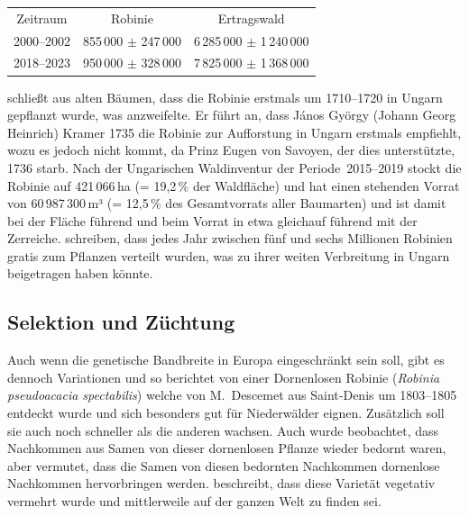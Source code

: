 \documentclass[twocolumn]{scrartcl}
\begin{document}
\begin{table}[htbp]
  \centering
\begin{tabular}{ccc}
Zeitraum   & Robinie  & Ertragswald \\
2000--2002  & 855\,000 $\pm$ 247\,000 & 6\,285\,000 $\pm$ 1\,240\,000 \\
2018--2023  & 950\,000 $\pm$ 328\,000 & 7\,825\,000 $\pm$ 1\,368\,000 
  \end{tabular}
  \label{tab:waldinventur}
\end{table}

\citet[S.~3]{vadas1911robinie} schließt aus alten Bäumen, dass
die Robinie erstmals um 1710--1720 in Ungarn gepflanzt wurde, was
\citet[S.~179]{ernyey1926robinie} anzweifelte. Er führt an, dass
János György (Johann Georg Heinrich) Kramer 1735 die Robinie zur
Aufforstung in Ungarn erstmals empfiehlt, wozu es jedoch nicht kommt, da
Prinz Eugen von Savoyen, der dies unterstützte, 1736 starb. Nach der
Ungarischen Waldinventur \citep{waldinventur20152019ungarn} der
Periode~2015--2019 stockt die Robinie auf
421\,066\,ha (= 19,2\,\% der Waldfläche) und hat einen stehenden Vorrat von
60\,987\,300\,m³ (= 12,5\,\% des Gesamtvorrats aller Baumarten) und ist
damit bei der Fläche führend und beim Vorrat in etwa gleichauf führend
mit der Zerreiche. \cite{bund1899robinie,gaskil1906robinie} schreiben,
dass jedes Jahr
zwischen fünf und sechs Millionen Robinien gratis zum Pflanzen verteilt wurden,
was zu ihrer weiten Verbreitung in Ungarn beigetragen haben könnte.

\subsection{Selektion und Züchtung}

Auch wenn die genetische Bandbreite in Europa eingeschränkt sein soll,
gibt es dennoch Variationen und so berichtet
\citet[S.~259--260]{Michaux1813arbres} von einer Dornenlosen Robinie
(\emph{Robinia pseudoacacia spectabilis}) welche von M.~Descemet aus
Saint‑Denis um 1803--1805 entdeckt wurde und sich besonders gut für
Niederwälder eignen. Zusätzlich soll sie auch noch schneller als die
anderen wachsen. Auch wurde beobachtet, dass Nachkommen aus Samen von
dieser dornenlosen Pflanze wieder bedornt waren, aber
\citet{Michaux1813arbres} vermutet, dass die Samen von diesen
bedornten Nachkommen dornenlose Nachkommen hervorbringen
werden. \citet[S.~173]{quatrefages1861robinie} beschreibt, dass diese
Varietät vegetativ vermehrt wurde und mittlerweile auf der ganzen Welt
zu finden sei.
\end{document}
